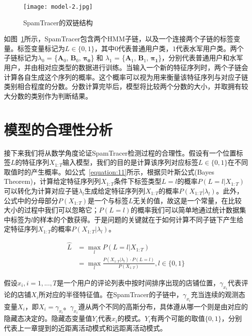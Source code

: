 \begin{figure}[htbp]
	\centering
	\begin{minipage}[htbp]{0.6\textwidth}
		\centering
		\texttt{[image: model-2.jpg]}
		\caption[SpamTracer的双链结构]
		{SpamTracer的双链结构\label{fig:lhmm}}		
	\end{minipage}     
\end{figure}


如图~\ref{fig:lhmm}所示，SpamTracer包含两个HMM子链，以及一个连接两个子链的标签变量。标签变量标记为$L\in\{0,1\}$，其中$0$代表普通用户类，$1$代表水军用户类。两个子链标记为$\lambda_{0}$ = \{$\mathbf{A}_0$, $\mathbf{B}_0$, $\mathbf{\pi_0}$\} 和 $\lambda_{1}$ = \{$\mathbf{A}_1$, $\mathbf{B}_1$, $\mathbf{\pi_1}$\}，分别代表普通用户和水军用户，并由相对应类型的数据进行训练。当输入一个新的特征序列时，两个子链会计算各自生成这个序列的概率。这个概率可以视为用来衡量该特征序列与对应子链类别相合程度的分数。分数计算完毕后，模型将比较两个分数的大小，并取拥有较大分数的类别作为判断结果。


\section{模型的合理性分析}


接下来我们将从数学角度论证SpamTracer检测过程的合理性。假设有一个位置标签$L$的特征序列$X_{1:T}$输入模型，我们的目的是计算该序列对应标签$L\in\{0,1\}$在不同取值时的产生概率。如公式~\eqref{equation:11}所示，根据贝叶斯公式(Bayes Theorem)，计算给定特征序列列$X_{1:T}$条件下标签类型$L = l$的概率$P(L=l|X_{1:T})$可以转化为计算对应子链$\lambda_l$生成给定特征序列列$X_{1:T}$的概率$P(X_{1:T} | \lambda_l)$。此外，公式中的分母部分$P(X_{1:T})$是一个与标签$L$无关的值，故这是一个常量，在比较大小的过程中我们可以忽略它；$P(L = l)$的概率我们可以简单地通过统计数据集中标签为$l$的样本的个数获得。于是问题的关键就在于如何计算不同子链下产生给定特征序列$X_{1:T}$的概率$P(X_{1:T} | \lambda_l)$。

\begin{equation}
\label{equation:11}
\begin{aligned}
\widehat{L} & = \max_{l}{P(L = l| X_{1:T})} \\
& = \max_{l}{\frac{P(X_{1:T} | \lambda_l) \cdot P(L = l)}{P(X_{1:T})}}, l\in \{0,1\}
\end{aligned}
\end{equation}

假设$x_i, i = 1,...,T$是一个用户的评论列表中按时间排序出现的店铺位置，$\gamma_{x_i}$代表评论的店铺$X_i$所对应的半径特征值。在SpamTracer的子链中，$\gamma_{x_i}$充当连续的观测态变量$X_i$，即$X_i = \gamma_{x_i}$。$\gamma_{x_i}$遵从两个不同的高斯分布，具体遵从哪一个则是由对应的隐藏态决定的。隐藏态变量值$Y_i$代表$x_i$的模式。$Y_i$有两个可能的取值$\{0,1\}$，分别代表上一章提到的近距离活动模式和远距离活动模式。

